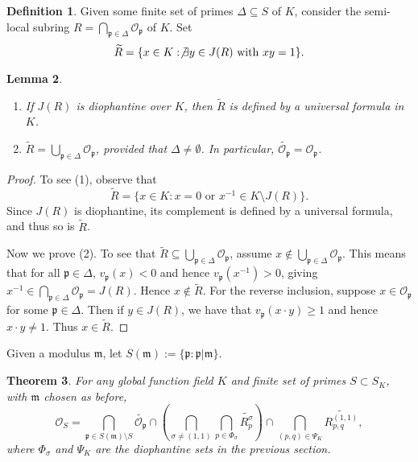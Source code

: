 \documentclass[12pt,reqno]{amsart}
\newcommand{\mm}{\mathfrak{m}}
\newcommand{\OO}{\mathcal{O}}
\newcommand{\pp}{\mathfrak{p}}
\newtheorem{thm}{Theorem}[section]
\newtheorem{lem}[thm]{Lemma}
\theoremstyle{definition}
\newtheorem{defn}[thm]{Definition}
\begin{document}
\begin{defn} Given some finite set of primes $\Delta\subseteq S$ of $K$, consider the semi-local subring $R=\bigcap_{\pp\in \Delta} \OO_{\pp}$ of $K$. Set 
\[
\widetilde{R}=\{x\in K: \not\exists y \in J(R) \text{ with } xy=1\}.
\]
\end{defn}

\begin{lem} $\left.\right.$
\begin{enumerate}
\item If $J(R)$ is diophantine over  $K$, then $\widetilde{R}$ is defined by a universal formula in $K$. 
\item $\widetilde{R}=\bigcup_{\pp\in \Delta} \OO_{\pp}$, provided that $\Delta\not=\emptyset$. In particular, $\widetilde{\OO_{\pp}}=\OO_{\pp}$.
\end{enumerate}
\end{lem}

\begin{proof}
To see (1), observe that 
\[
\widetilde{R}=\{x\in K: x=0 \text{ or } x^{-1}\in K\setminus J(R)\}.
\]
Since $J(R)$ is diophantine, its complement is defined by a universal formula, and thus so is $\widetilde{R}$. 

Now we prove (2). To see that $\widetilde{R}\subseteq\bigcup_{\pp\in \Delta} \OO_{\pp}$, assume $x\not\in \bigcup_{\pp\in \Delta} \OO_{\pp}$. This means that for all $\pp\in \Delta$, $v_{\pp}(x)<0$  and hence $v_{\pp}(x^{-1})>0$, giving $x^{-1}\in \bigcap_{\pp\in \Delta} \OO_{\pp} = J(R)$. Hence $x\not\in \widetilde{R}$. For the reverse inclusion, suppose $x\in \OO_{\pp}$ for some $\pp\in \Delta$. Then if $y\in J(R)$, we have that $v_{\pp}(x\cdot y)\geq 1$ and hence $x\cdot y \not=1$. Thus $x\in \widetilde{R}$. 
\end{proof}

Given a modulus $\mm$, let $S(\mm):=\{\pp: \pp|\mm\}$. 
\begin{thm}\label{univdefeqn}
For any global function field $K$ and finite set of primes $S\subset S_K$, with $\mm$ chosen as before,
\[
\OO_S = \bigcap_{\pp\in S(\mm)\setminus S} \widetilde{\OO_{\pp}} \cap \left(\bigcap_{\sigma\not=(1,1)}\bigcap_{p\in \Phi_{\sigma}} \widetilde{R_p^{\sigma}}\right) \cap \bigcap_{(p,q)\in \Psi_{K}} \widetilde{R_{p,q}^{(1,1)}},
\]
where $\Phi_{\sigma}$ and $\Psi_{K}$ are the diophantine sets in the previous section. 
\end{thm}
\end{document}
